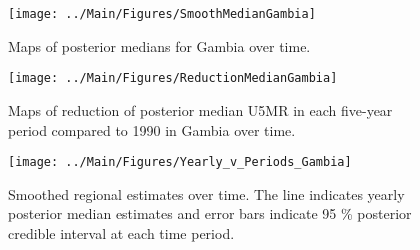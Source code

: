 \documentclass[12pt]{article}\usepackage[]{graphicx}\usepackage[]{color}
\newenvironment{knitrout}{}{} %
\begin{document}
\begin{knitrout}
\color{fgcolor}\begin{figure}[bht]

{\centering \texttt{[image: ../Main/Figures/SmoothMedianGambia]} 

}

\caption[Maps of posterior medians for Gambia  over time]{Maps of posterior medians for Gambia  over time.}\label{fig:unnamed-chunk-134}
\end{figure}


\end{knitrout}
\begin{knitrout}
\color{fgcolor}\begin{figure}[bht]

{\centering \texttt{[image: ../Main/Figures/ReductionMedianGambia]} 

}

\caption[Maps of reduction of posterior median U5MR in each five-year period compared to 1990 in Gambia over time]{Maps of reduction of posterior median U5MR in each five-year period compared to 1990 in Gambia over time.}\label{fig:unnamed-chunk-135}
\end{figure}


\end{knitrout}
\begin{knitrout}
\color{fgcolor}\begin{figure}[bht]

{\centering \texttt{[image: ../Main/Figures/Yearly\_v\_Periods\_Gambia]} 

}

\caption[Smoothed regional estimates over time]{Smoothed regional estimates over time. The line indicates yearly posterior median estimates and error bars indicate 95 \% posterior credible interval at each time period.}\label{fig:unnamed-chunk-136}
\end{figure}


\end{knitrout}
\end{document}
